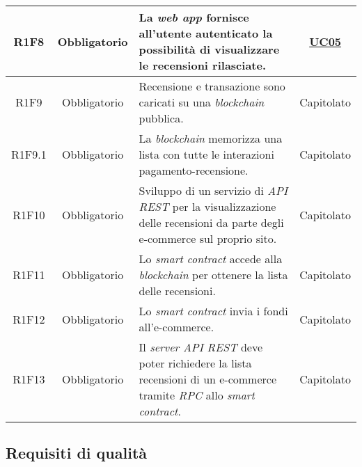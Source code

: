 \begin{longtable}{c c p{6cm} c}
            R1F8 &
            Obbligatorio &
        	La \textit{web app} fornisce all'utente autenticato la possibilità di visualizzare le recensioni rilasciate.&
            \hyperref[UC05]{UC05} \\
            \hline

            R1F9 &
            Obbligatorio &
        	Recensione e transazione sono caricati su una \textit{blockchain} pubblica. &
            Capitolato \\
            \hline

            R1F9.1 &
            Obbligatorio &
        	La \textit{blockchain} memorizza una lista con tutte le interazioni pagamento-recensione. &
            Capitolato \\
            \hline

            R1F10 &
            Obbligatorio &
        	Sviluppo di un servizio di \textit{API REST} per la visualizzazione delle recensioni da parte degli e-commerce sul proprio sito. &
            Capitolato \\
            \hline

            R1F11 &
            Obbligatorio &
        	Lo \textit{smart contract} accede alla \textit{blockchain} per ottenere la lista delle recensioni. &
            Capitolato \\
            \hline

            R1F12 &
            Obbligatorio &
        	Lo \textit{smart contract} invia i fondi all'e-commerce. &
            Capitolato \\
            \hline

            R1F13&
            Obbligatorio &
            Il \textit{server API REST} deve poter richiedere la lista recensioni di un e-commerce tramite \textit{RPC} allo \textit{smart contract}. &
            Capitolato \\
            \hline

        \end{longtable}

    \subsection{Requisiti di qualità}

